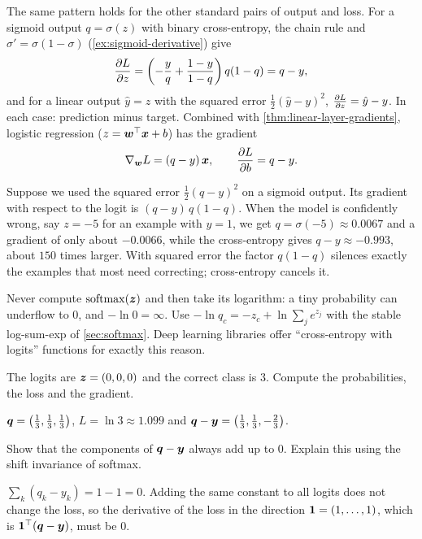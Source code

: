 The same pattern holds for the other standard pairs of output and loss. For a
sigmoid output $q = \sigma(z)$ with binary cross-entropy, the chain rule and
$\sigma' = \sigma(1 - \sigma)$ (\cref{ex:sigmoid-derivative}) give
\[
  \frac{\partial L}{\partial z} = \left(-\frac yq + \frac{1 - y}{1 - q}\right)q(1 - q) = q - y ,
\]
and for a linear output $\hat y = z$ with the squared error $\frac12(\hat y - y)^2$,
$\frac{\partial L}{\partial z} = \hat y - y$. In each case: prediction minus target. Combined with
\cref{thm:linear-layer-gradients}, logistic regression ($z = \bm{w}^\top\bm{x} + b$) has
the gradient
\[
  \nabla_{\bm{w}}L = (q - y)\,\bm{x}, \qquad \frac{\partial L}{\partial b} = q - y .
\]

\begin{remark}
Suppose we used the squared error $\frac12(q - y)^2$ on a sigmoid output. Its
gradient with respect to the logit is $(q - y)\,q(1 - q)$. When the model is
confidently wrong, say $z = -5$ for an example with $y = 1$, we get
$q = \sigma(-5) \approx 0.0067$ and a gradient of only about $-0.0066$, while the
cross-entropy gives $q - y \approx -0.993$, about $150$ times larger. With squared
error the factor $q(1 - q)$ silences exactly the examples that most need
correcting; cross-entropy cancels it.
\end{remark}

\begin{pitfall}
Never compute $\operatorname{softmax}(\bm{z})$ and then take its logarithm: a tiny probability can
underflow to $0$, and $-\ln0 = \infty$. Use $-\ln q_c = -z_c + \ln\sum_je^{z_j}$ with
the stable log-sum-exp of \cref{sec:softmax}. Deep learning libraries offer
``cross-entropy with logits'' functions for exactly this reason.
\end{pitfall}

\sectionexercises

\begin{exercise}
The logits are $\bm{z} = (0, 0, 0)$ and the correct class is $3$. Compute the
probabilities, the loss and the gradient.
\end{exercise}
\begin{solution}
$\bm{q} = \left(\tfrac13, \tfrac13, \tfrac13\right)$, $L = \ln3 \approx 1.099$ and
$\bm{q} - \bm{y} = \left(\tfrac13, \tfrac13, -\tfrac23\right)$.
\end{solution}

\begin{exercise}
Show that the components of $\bm{q} - \bm{y}$ always add up to $0$. Explain this using
the shift invariance of softmax.
\end{exercise}
\begin{solution}
$\sum_k(q_k - y_k) = 1 - 1 = 0$. Adding the same constant to all logits does not
change the loss, so the derivative of the loss in the direction $\bm{1} =
(1, \dots, 1)$, which is $\bm{1}^\top(\bm{q} - \bm{y})$, must be $0$.
\end{solution}

